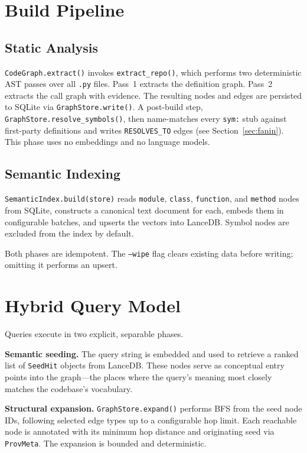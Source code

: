 \documentclass[10pt]{article}
\begin{document}
\section{Build Pipeline}

\subsection{Static Analysis}

\texttt{CodeGraph.extract()} invokes \texttt{extract\_repo()}, which performs
two deterministic AST passes over all \texttt{.py} files. Pass~1 extracts the
definition graph. Pass~2 extracts the call graph with evidence. The resulting
nodes and edges are persisted to SQLite via \texttt{GraphStore.write()}.
A post-build step, \texttt{Graph\-Store.resolve\_symbols()}, then name-matches
every \texttt{sym:} stub against first-party definitions and writes
\texttt{RESOLVES\_TO} edges (see Section~\ref{sec:fanin}). This phase uses no
embeddings and no language models.

\subsection{Semantic Indexing}

\texttt{SemanticIndex.build(store)} reads \texttt{module}, \texttt{class},
\texttt{function}, and \texttt{method} nodes from SQLite, constructs a canonical
text document for each, embeds them in configurable batches, and upserts the
vectors into LanceDB. Symbol nodes are excluded from the index by default.

Both phases are idempotent. The \texttt{--wipe} flag clears existing data before
writing; omitting it performs an upsert.

\section{Hybrid Query Model}

Queries execute in two explicit, separable phases.

\textbf{Semantic seeding.} The query string is embedded and used to retrieve a
ranked list of \texttt{SeedHit} objects from LanceDB. These nodes serve as
conceptual entry points into the graph---the places where the query's meaning
most closely matches the codebase's vocabulary.

\textbf{Structural expansion.} \texttt{GraphStore.expand()} performs BFS from the
seed node IDs, following selected edge types up to a configurable hop limit. Each
reachable node is annotated with its minimum hop distance and originating seed via
\texttt{ProvMeta}. The expansion is bounded and deterministic.
\end{document}
